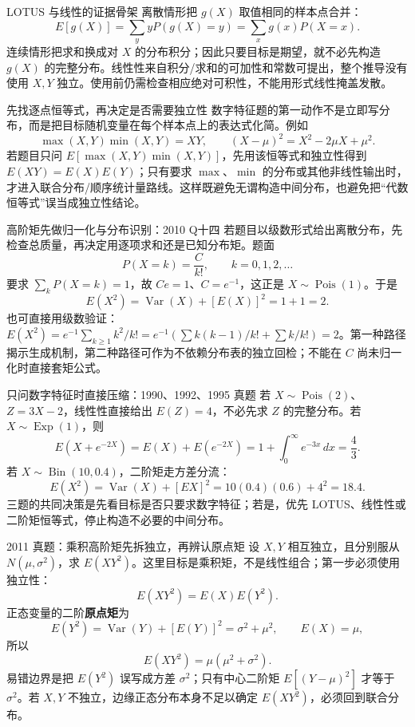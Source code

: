 \documentclass[11pt,a4paper]{ctexart}
\begin{document}
\begin{methodbox}{LOTUS 与线性的证据骨架}
离散情形把 $g(X)$ 取值相同的样本点合并：
\[
E[g(X)]=\sum_y yP(g(X)=y)=\sum_xg(x)P(X=x).
\]
连续情形把求和换成对 $X$ 的分布积分；因此只要目标是期望，就不必先构造 $g(X)$ 的完整分布。线性性来自积分/求和的可加性和常数可提出，整个推导没有使用 $X,Y$ 独立。使用前仍需检查相应绝对可积性，不能用形式线性掩盖发散。
\end{methodbox}
\begin{methodbox}{先找逐点恒等式，再决定是否需要独立性}
数字特征题的第一动作不是立即写分布，而是把目标随机变量在每个样本点上的表达式化简。例如
\[
\max(X,Y)\min(X,Y)=XY,
\qquad
(X-\mu)^2=X^2-2\mu X+\mu^2.
\]
若题目只问 $E[\max(X,Y)\min(X,Y)]$，先用该恒等式和独立性得到 $E(XY)=E(X)E(Y)$；只有要求 $\max$、$\min$ 的分布或其他非线性输出时，才进入联合分布/顺序统计量路线。这样既避免无谓构造中间分布，也避免把“代数恒等式”误当成独立性结论。
\end{methodbox}

\begin{methodbox}{高阶矩先做归一化与分布识别：2010 Q十四}
若题目以级数形式给出离散分布，先检查总质量，再决定用逐项求和还是已知分布矩。题面
\[
P(X=k)=\frac{C}{k!},\qquad k=0,1,2,\ldots
\]
要求 $\sum_kP(X=k)=1$，故 $Ce=1$、$C=e^{-1}$，这正是 $X\sim\operatorname{Pois}(1)$。于是
\[
E(X^2)=\operatorname{Var}(X)+[E(X)]^2=1+1=2.
\]
也可直接用级数验证：$E(X^2)=e^{-1}\sum_{k\ge1}k^2/k!=e^{-1}(\sum k(k-1)/k!+\sum k/k!)=2$。第一种路径揭示生成机制，第二种路径可作为不依赖分布表的独立回检；不能在 $C$ 尚未归一化时直接套矩公式。
\end{methodbox}

\begin{examplebox}{只问数字特征时直接压缩：1990、1992、1995 真题}
若 $X\sim\operatorname{Pois}(2)$、$Z=3X-2$，线性性直接给出 $E(Z)=4$，不必先求 $Z$ 的完整分布。若 $X\sim\operatorname{Exp}(1)$，则
\[
E(X+e^{-2X})=E(X)+E(e^{-2X})=1+\int_0^\infty e^{-3x}\,dx=\frac43.
\]
若 $X\sim\operatorname{Bin}(10,0.4)$，二阶矩走方差分流：
\[
E(X^2)=\operatorname{Var}(X)+[EX]^2=10(0.4)(0.6)+4^2=18.4.
\]
三题的共同决策是先看目标是否只要求数字特征；若是，优先 LOTUS、线性性或二阶矩恒等式，停止构造不必要的中间分布。
\end{examplebox}

\begin{examplebox}{2011 真题：乘积高阶矩先拆独立，再辨认原点矩}
设 $X,Y$ 相互独立，且分别服从 $N(\mu,\sigma^2)$，求 $E(XY^2)$。这里目标是乘积矩，不是线性组合；第一步必须使用独立性：
\[
E(XY^2)=E(X)E(Y^2).
\]
正态变量的二阶\textbf{原点矩}为
\[
E(Y^2)=\operatorname{Var}(Y)+[E(Y)]^2=\sigma^2+\mu^2,
\qquad E(X)=\mu,
\]
所以
\[
\boxed{E(XY^2)=\mu(\mu^2+\sigma^2)}.
\]
易错边界是把 $E(Y^2)$ 误写成方差 $\sigma^2$；只有中心二阶矩 $E[(Y-\mu)^2]$ 才等于 $\sigma^2$。若 $X,Y$ 不独立，边缘正态分布本身不足以确定 $E(XY^2)$，必须回到联合分布。
\end{examplebox}
\end{document}
